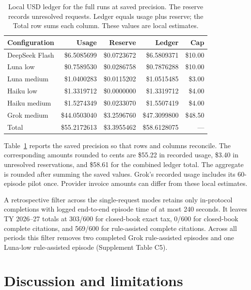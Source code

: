 \documentclass[10pt,letterpaper,twocolumn]{article}
\begin{document}
\begin{table}[!tb]
  \centering\small
  \setlength{\tabcolsep}{3pt}
  \caption{Local USD ledger for the full runs at saved precision. The reserve records unresolved requests. Ledger equals usage plus reserve; the Total row sums each column. These values are local estimates.}
  \label{tab:costs}
  \begin{tabular*}{\columnwidth}{@{\extracolsep{\fill}}lrrrr@{}}
    \toprule
    \textbf{Configuration} & \textbf{Usage} & \textbf{Reserve} & \textbf{Ledger} & \textbf{Cap} \\
    \midrule
    DeepSeek Flash & \$6.5085699 & \$0.0723672 & \$6.5809371 & \$10.00 \\
    Luna low & \$0.7589530 & \$0.0286758 & \$0.7876288 & \$10.00 \\
    Luna medium & \$1.0400283 & \$0.0115202 & \$1.0515485 & \$3.00 \\
    Haiku low & \$1.3319712 & \$0.0000000 & \$1.3319712 & \$4.00 \\
    Haiku medium & \$1.5274349 & \$0.0233070 & \$1.5507419 & \$4.00 \\
    Grok medium & \$44.0503040 & \$3.2596760 & \$47.3099800 & \$48.50 \\
    \midrule
    Total & \$55.2172613 & \$3.3955462 & \$58.6128075 & --- \\
    \bottomrule
  \end{tabular*}
\end{table}

Table~\ref{tab:costs} reports the saved precision so that rows and columns reconcile. The corresponding amounts rounded to cents are \$55.22 in recorded usage, \$3.40 in unresolved reservations, and \$58.61 for the combined ledger total. The aggregate is rounded after summing the saved values. Grok's recorded usage includes its 60-episode pilot once. Provider invoice amounts can differ from these local estimates.

A retrospective filter across the single-request modes retains only in-protocol completions with logged end-to-end episode time of at most 240 seconds. It leaves TY 2026--27 totals at 303/600 for closed-book exact tax, 0/600 for closed-book complete citations, and 569/600 for rule-assisted complete citations. Across all periods this filter removes two completed Grok rule-assisted episodes and one Luna-low rule-assisted episode (Supplement Table C5).

\section{Discussion and limitations}
\end{document}
